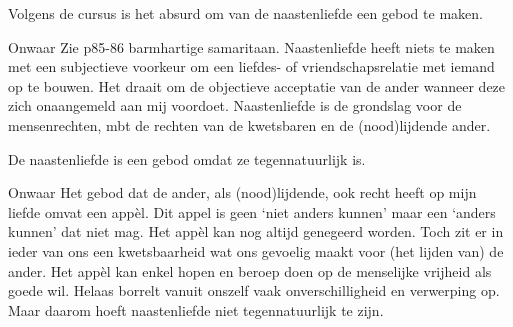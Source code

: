\documentclass[main.tex]{subfiles}
\begin{document}
\begin{examenvraag}
    \begin{stelling}
        Volgens de cursus is het absurd om van de naastenliefde een gebod te maken.
    \end{stelling}

    \begin{stelling-antwoord}{Onwaar}
        Zie p85-86 barmhartige samaritaan.
        Naastenliefde heeft niets te maken met een subjectieve voorkeur om‭ ‬een liefdes-‭ ‬of 
        vriendschapsrelatie met iemand op te bouwen.‭ ‬Het draait om de objectieve acceptatie van de 
        ander wanneer deze zich onaangemeld aan mij voordoet.‭ ‬Naastenliefde is de grondslag voor de 
        mensenrechten,‭ ‬mbt de rechten van de kwetsbaren en de‭ (‬nood)lijdende ander.
    \end{stelling-antwoord}
\end{examenvraag}


\begin{examenvraag}
    \begin{stelling}
        De naastenliefde is een gebod omdat ze tegennatuurlijk is.
    \end{stelling}



    \begin{stelling-antwoord}{Onwaar}
        Het gebod dat de ander,‭ ‬als‭ (‬nood)lijdende,‭ ‬ook recht heeft op mijn liefde omvat een appèl.‭ 
        ‬Dit appel is geen‭ ‬‘niet anders kunnen‭’‬ maar een‭ ‬‘anders kunnen‭’‬ dat niet mag.‭ ‬Het appèl kan 
        nog altijd genegeerd worden.‭ ‬Toch zit er in ieder van ons een kwetsbaarheid wat ons 
        gevoelig maakt voor‭ (‬het lijden van‭) ‬de ander.‭ ‬Het appèl‭ ‬kan enkel hopen en beroep doen op 
        de menselijke vrijheid als goede wil.‭ ‬Helaas borrelt vanuit onszelf vaak onverschilligheid 
        en verwerping op.‭ ‬Maar daarom hoeft naastenliefde niet tegennatuurlijk te zijn.
    \end{stelling-antwoord}
\end{examenvraag}
\end{document}
